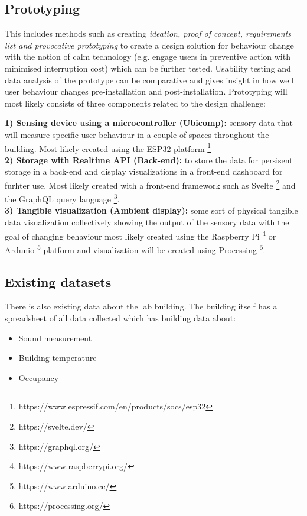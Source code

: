 \subsection{Prototyping}

This includes methods such as creating \emph{ideation, proof of concept, requirements list and provocative prototyping} to create a design solution for behaviour change with the notion of calm technology (e.g. engage users in preventive action with minimised interruption cost) which can be further tested. Usability testing and data analysis of the prototype can be comparative and gives insight in how well user behaviour changes pre-installation and post-installation. Prototyping will most likely consists of three components related to the design challenge: 

\textbf{1) Sensing device using a microcontroller (Ubicomp): } sensory data that will measure specific user behaviour in a couple of spaces throughout the building. Most likely created using the ESP32 platform \footnote{https://www.espressif.com/en/products/socs/esp32} \\
\textbf{2) Storage with Realtime API (Back-end): } to store the data for persisent storage in a back-end and display visualizations in a front-end dashboard for furhter use. Most likely created with a front-end framework such as Svelte \footnote{https://svelte.dev/} and the GraphQL query language \footnote{https://graphql.org/}.\\
\textbf{3) Tangible visualization (Ambient display): } some sort of physical tangible data visualization collectively showing the output of the sensory data with the goal of changing behaviour most likely created using the Raspberry Pi \footnote{https://www.raspberrypi.org/} or Ardunio \footnote{https://www.arduino.cc/} platform and visualization will be created using Processing \footnote{https://processing.org/}.


\subsection{Existing datasets}

There is also existing data about the lab building. The building itself has a spreadsheet of all data collected which has building data about:

\begin{itemize}
  \item Sound measurement
  \item Building temperature
  \item Occupancy
\end{itemize}

